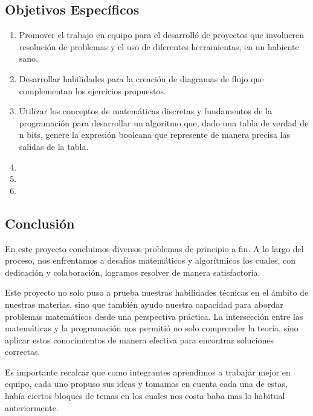 \documentclass[conference]{IEEEtran}
\begin{document}
\subsection{Objetivos Específicos}
\begin{enumerate}
    \item Promover el trabajo en equipo para el desarrolló de proyectos que involucren resolución de problemas y el uso de diferentes herramientas,  en un habiente sano.
    \item Desarrollar habilidades para la creación de diagramas de flujo que complementan los ejercicios  propuestos.
    \item Utilizar los conceptos de matemáticas discretas y fundamentos de la programación para desarrollar un algoritmo que, dado una tabla de verdad de n bits, genere la expresión booleana que represente de manera precisa las salidas de la tabla.
    \item 
    \item 
    \item 
\end{enumerate}














\subsection{Conclusión}

En este proyecto concluimos diversos problemas  de principio a fin.  A lo largo del proceso, nos enfrentamos a desafíos matemáticos y algorítmicos los cuales, con dedicación y colaboración, logramos resolver de manera satisfactoria.

Este proyecto no solo puso a prueba nuestras habilidades técnicas en el ámbito de nuestras materias, sino que también ayudo nuestra capacidad para abordar problemas matemáticos desde una perspectiva práctica. La intersección entre las matemáticas y la programación nos permitió no solo comprender la teoría, sino aplicar estos conocimientos de manera efectiva para encontrar soluciones correctas.

Es importante recalcar que como integrantes aprendimos a trabajar mejor en equipo, cada uno propuso sus ideas y tomamos en cuenta cada una de estas, había ciertos bloques de temas en los cuales nos costa baba mas lo habitual anteriormente. 
\end{document}
